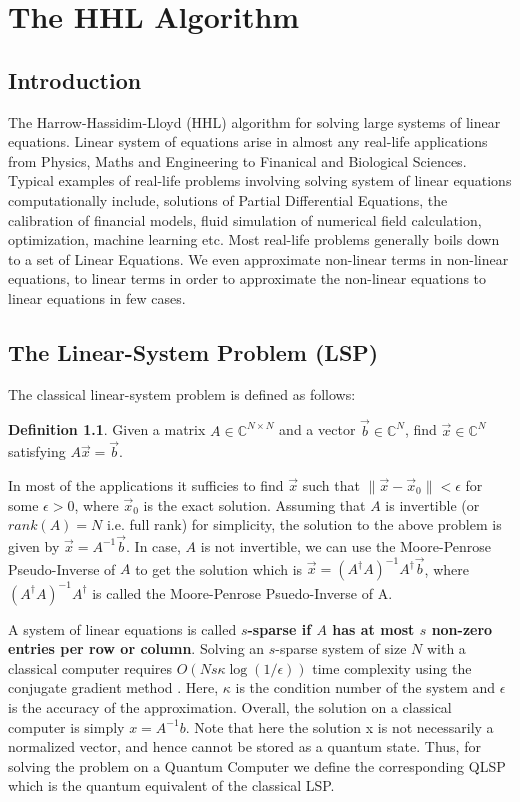 \documentclass[12pt, oneside]{book}
\theoremstyle{definition}
\newtheorem{definition}{Definition}[section]
\theoremstyle{definition}
\theoremstyle{remark}
\begin{document}
\chapter{The HHL Algorithm}
\section{Introduction}
The Harrow-Hassidim-Lloyd (HHL) \cite{harrow2009quantum} 
algorithm for solving large systems of linear equations.
Linear system of equations arise in almost any real-life applications from Physics, Maths and Engineering
to Finanical and Biological Sciences. Typical examples of real-life problems involving solving system of linear equations computationally include, 
solutions of Partial Differential Equations, the calibration of financial models, fluid simulation 
of numerical field calculation, optimization, machine learning etc. 
Most real-life problems generally boils down to a set of Linear Equations. We even approximate 
non-linear terms in non-linear equations, to linear terms in order to approximate the non-linear equations to linear equations in few cases.

\section{The Linear-System Problem (LSP)}
The classical linear-system problem is defined as follows:
\begin{definition}
Given a matrix $A\in \mathbb{C}^{N \times N}$ and a vector $\vec{b} \in \mathbb{C}^N$, find $\vec{x} \in \mathbb{C}^N$
satisfying $A\vec{x}=\vec{b}$.
\end{definition}

In most of the applications it sufficies to find 
$\vec{x}$ such that $\|\vec{x}-\vec{x}_0\|<\epsilon$ for some $\epsilon>0$, 
where $\vec{x}_0$ is the exact solution.
Assuming that $A$ is invertible (or $rank(A)=N$ i.e. full rank)
for simplicity, the solution to the above problem is given by $\vec{x}=A^{-1}\vec{b}$.
In case, $A$ is not invertible, we can use the Moore-Penrose Pseudo-Inverse of $A$ to get the solution which is 
$\vec{x}=(A^{\dagger}A)^{-1}A^{\dagger}\vec{b}$, where $(A^{\dagger}A)^{-1}A^{\dagger}$ is called the Moore-Penrose Psuedo-Inverse of A.

A system of linear equations is called \textbf{$s$-sparse if $A$ has at most $s$ non-zero entries per row or column}. 
Solving an $s$-sparse system of size $N$ with a classical computer requires $O(Ns\kappa \log (1/\epsilon))$ time complexity
using the conjugate gradient method \cite{shewchuk1994introduction}. Here, $\kappa$ is the condition number of the system and 
$\epsilon$ is the accuracy of the approximation. Overall, the solution on a classical computer is simply $x=A^{-1}b$. Note that here the solution x is not necessarily a normalized vector, and hence cannot be stored as a quantum state. Thus, for solving the problem on a Quantum Computer we define the corresponding QLSP which is the quantum equivalent of the classical LSP.
\end{document}
